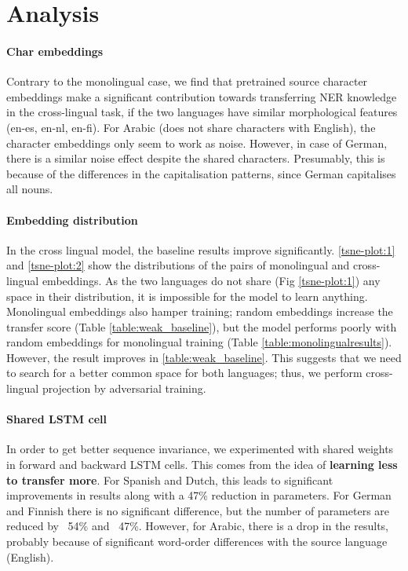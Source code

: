 \documentclass[letterpaper]{article} \usepackage{aaai20}  \usepackage{times}  \usepackage{helvet} \usepackage{courier}  \usepackage[hyphens]{url}  \usepackage{graphicx} \urlstyle{rm} \def\UrlFont{\rm}  \usepackage{graphicx}  \frenchspacing  \setlength{\pdfpagewidth}{8.5in}  \setlength{\pdfpageheight}{11in}
\begin{document}
\section{Analysis}

\paragraph{Char embeddings}
Contrary to the monolingual case, we find that pretrained source character embeddings make a significant contribution towards transferring NER knowledge in the cross-lingual task, if the two languages have similar morphological features (en-es, en-nl, en-fi). For Arabic (does not share characters with English), the character embeddings only seem to work as noise. However, in case of German, there is a similar noise effect despite the shared characters. Presumably, this is because of the differences in the capitalisation patterns, since German capitalises all nouns.


\paragraph{Embedding distribution}
In the cross lingual model, the baseline results improve significantly. \ref{tsne-plot:1} and \ref{tsne-plot:2} show the distributions of the pairs of monolingual and cross-lingual embeddings. As the two languages do not share (Fig \ref{tsne-plot:1}) any space in their distribution, it is impossible for the model to learn anything. Monolingual embeddings also hamper training; random embeddings increase the transfer score (Table \ref{table:weak_baseline}), but the model performs poorly with random embeddings for monolingual training (Table \ref{table:monolingualresults}). However, the result improves in \ref{table:weak_baseline}. This suggests that we need to search for a better common space for both languages; thus, we perform cross-lingual projection by adversarial training.


\paragraph{Shared LSTM cell}
In order to get better sequence invariance, we experimented with shared weights in forward and backward LSTM cells. This comes from the idea of \textbf{learning less to transfer more}. For Spanish and Dutch, this leads to significant improvements in results along with a 47\% reduction in parameters. For German and Finnish there is no significant difference, but the number of parameters are reduced by ~54\% and ~47\%.  However, for Arabic, there is a drop in the results, probably because of significant word-order differences with the source language (English).
\end{document}
